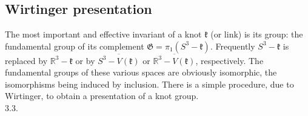 \documentclass[10pt, letterpaper]{article}
\begin{document}
\pagebreak

\subsection{Wirtinger presentation}

The most important and effective invariant of a knot $\mathfrak{k}$ (or link) is its group: the fundamental group of its complement $\mathfrak{G}=\pi_{1}\left(S^{3}-\mathfrak{k}\right)$. Frequently $S^{3}-\mathfrak{k}$ is replaced by $\mathbb{R}^{3}-\mathfrak{k}$ or by $\overline{S^{3}-V(\mathfrak{k})}$ or $\overline{\mathbb{R}^{3}-V(\mathfrak{k})}$, respectively. The fundamental groups of these various spaces are obviously isomorphic, the isomorphisms being induced by inclusion. There is a simple procedure, due to Wirtinger, to obtain a presentation of a knot group.\\

3.3. 
\end{document}
